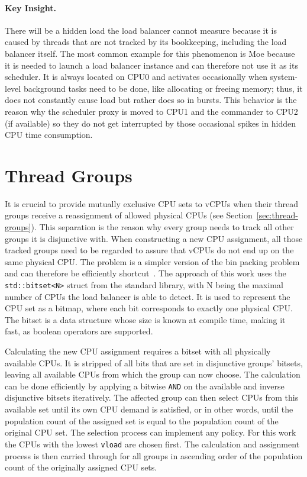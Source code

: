 \paragraph{Key Insight.}
\label{sec:insight-placement}

There will be a hidden load the load balancer cannot measure because it is caused by threads that are not tracked by its bookkeeping, including the load balancer itself.
The most common example for this phenomenon is Moe because it is needed to launch a load balancer instance and can therefore not use it as its scheduler.
It is always located on CPU0 and activates occasionally when system-level background tasks need to be done, like allocating or freeing memory; thus, it does not constantly cause load but rather does so in bursts. 
This behavior is the reason why the scheduler proxy is moved to CPU1 and the commander to CPU2 (if available) so they do not get interrupted by those occasional spikes in hidden CPU time consumption.

\section{Thread Groups}

It is crucial to provide mutually exclusive CPU sets to vCPUs when their thread groups receive a reassignment of allowed physical CPUs (see Section~\ref{sec:thread-groups}).
This separation is the reason why every group needs to track all other groups it is disjunctive with.
When constructing a new CPU assignment, all those tracked groups need to be regarded to assure that vCPUs do not end up on the same physical CPU.
The problem is a simpler version of the bin packing problem and can therefore be efficiently shortcut~\cite{binpacking}.
The approach of this work uses the \texttt{std::bitset<N>} struct from the standard library, with N being the maximal number of CPUs the load balancer is able to detect.
It is used to represent the CPU set as a bitmap, where each bit corresponds to exactly one physical CPU.
The bitset is a data structure whose size is known at compile time, making it fast, as boolean operators are supported.

Calculating the new CPU assignment requires a bitset with all physically available CPUs.
It is stripped of all bits that are set in disjunctive groups' bitsets, leaving all available CPUs from which the group can now choose.
The calculation can be done efficiently by applying a bitwise \texttt{AND} on the available and inverse disjunctive bitsets iteratively.
The affected group can then select CPUs from this available set until its own CPU demand is satisfied, or in other words, until the population count of the assigned set is equal to the population count of the original CPU set.
The selection process can implement any policy.
For this work the CPUs with the lowest \texttt{vload} are chosen first.
The calculation and assignment process is then carried through for all groups in ascending order of the population count of the originally assigned CPU sets.

